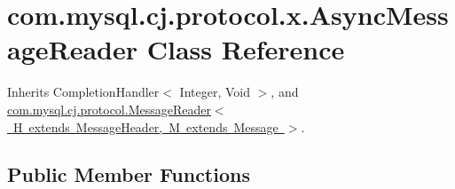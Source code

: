 \hypertarget{classcom_1_1mysql_1_1cj_1_1protocol_1_1x_1_1_async_message_reader}{}\section{com.\+mysql.\+cj.\+protocol.\+x.\+Async\+Message\+Reader Class Reference}
\label{classcom_1_1mysql_1_1cj_1_1protocol_1_1x_1_1_async_message_reader}


Inherits Completion\+Handler$<$ Integer, Void $>$, and \mbox{\hyperlink{interfacecom_1_1mysql_1_1cj_1_1protocol_1_1_message_reader}{com.\+mysql.\+cj.\+protocol.\+Message\+Reader$<$ H extends Message\+Header, M extends Message $>$}}.

\subsection*{Public Member Functions}
